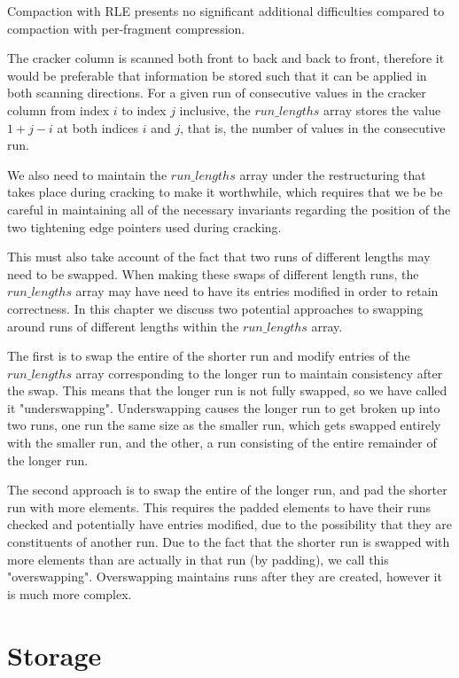 Compaction with RLE presents no significant additional difficulties compared to compaction with per-fragment compression. 

The cracker column is scanned both front to back and back to front, therefore it would be preferable
that information be stored such that it can be applied in both scanning directions. For a given run of consecutive values in the cracker column from index $i$ to index $j$ inclusive, the $run\_lengths$ array stores the value $1 + j - i$ at both indices $i$ and $j$, that is, the number of values in the consecutive run.

We also need to maintain the $run\_lengths$ array under the restructuring that takes place during
cracking to make it worthwhile, which requires that we be be careful in maintaining all of the
necessary invariants regarding the position of the two tightening edge pointers used during cracking.

This must also take account of the fact that two runs of different lengths may need to be swapped. When making these swaps of different length runs, the $run\_lengths$ array may have need to have its entries modified in order to retain correctness. In this chapter we discuss two potential approaches to swapping around runs of different lengths within the $run\_lengths$ array.

The first is to swap the entire of the shorter run and modify entries of the $run\_lengths$ array
corresponding to the longer run to maintain consistency after the swap. This means that the longer
run is not fully swapped, so we have called it "underswapping". Underswapping causes the longer run
to get broken up into two runs, one run the same size as the smaller run, which gets swapped entirely with the smaller run, and the other, a run consisting of the entire remainder of the longer run.

The second approach is to swap the entire of the longer run, and pad the shorter run with more elements. This requires the padded elements to have their runs checked and potentially have entries modified, due to the possibility that they are constituents of another run. Due to the fact that the shorter run is swapped with more elements than are actually in that run (by padding), we call this "overswapping". Overswapping maintains runs after they are created, however it is much more complex.

\section{Storage}

